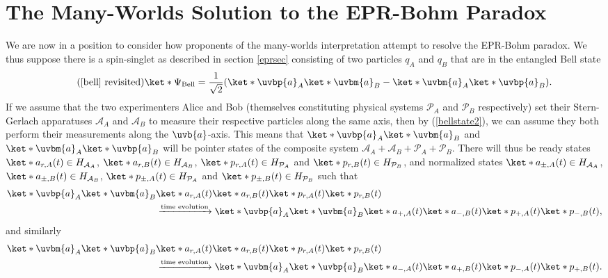 \documentclass[12pt]{report}
\begin{document}
   


\section{The Many-Worlds Solution to the EPR-Bohm Paradox}
We are now in a position to consider how proponents of the many-worlds interpretation attempt to resolve the EPR-Bohm paradox. We thus suppose there is a spin-singlet as described in section \ref{eprsec} consisting of two particles $q_A$ and $q_B$ that are in the entangled Bell state 
\begin{equation}\tag{\ref{bell} revisited}
      \ket*{\Psi_{\text{Bell}}}=\frac{1}{\sqrt{2}}(\ket*{\uvbp{a}}_A\ket*{\uvbm{a}}_B-\ket*{\uvbm{a}}_A\ket*{\uvbp{a}}_B).
\end{equation}
If we assume that the two experimenters Alice and Bob (themselves constituting physical systems $\mathcal{P}_A$ and $\mathcal{P}_B$ respectively) set their Stern-Gerlach apparatuses $\mathcal{A}_A$ and $\mathcal{A}_B$  %
%
to measure their respective particles along the same axis, then by (\ref{bellstate2}), we can assume they both perform their measurements along the $\uvb{a}$-axis. This means that $\ket*{\uvbp{a}}_A\ket*{\uvbm{a}}_B$ and $\ket*{\uvbm{a}}_A\ket*{\uvbp{a}}_B$ will be pointer states of the composite system $\mathcal{A}_A+\mathcal{A}_B+\mathcal{P}_A+\mathcal{P}_B$. There will thus be ready states $\ket*{a_{r,A}(t)}\in H_{\mathcal{A}_A}$, $\ket*{a_{r,B}(t)}\in H_{\mathcal{A}_B}$, $\ket*{p_{r,A}(t)}\in H_{\mathcal{P}_A}$ and $\ket*{p_{r,B}(t)}\in H_{\mathcal{P}_B}$, and normalized states  $\ket*{a_{\pm,A}(t)}\in H_{\mathcal{A}_A}$, $\ket*{a_{\pm,B}(t)}\in H_{\mathcal{A}_B}$, $\ket*{p_{\pm,A}(t)}\in H_{\mathcal{P}_A}$ and $\ket*{p_{\pm,B}(t)}\in H_{\mathcal{P}_B}$ such that  
\begin{align*}\ket*{\uvbp{a}}_A\ket*{\uvbm{a}}_B&\ket*{a_{r,A}(t)}\ket*{a_{r,B}(t)}\ket*{p_{r, A}(t)}\ket*{p_{r, B}(t)}\\ &\xrightarrow{\text{time evolution}}\ket*{\uvbp{a}}_A\ket*{\uvbm{a}}_B\ket*{a_{+,A}(t)}\ket*{a_{-,B}(t)}\ket*{p_{+, A}(t)}\ket*{p_{-, B}(t)},\end{align*}
and similarly
\begin{align*}\ket*{\uvbm{a}}_A\ket*{\uvbp{a}}_B&\ket*{a_{r,A}(t)}\ket*{a_{r,B}(t)}\ket*{p_{r, A}(t)}\ket*{p_{r, B}(t)}\\ &\xrightarrow{\text{time evolution}}\ket*{\uvbm{a}}_A\ket*{\uvbp{a}}_B\ket*{a_{-,A}(t)}\ket*{a_{+,B}(t)}\ket*{p_{-, A}(t)}\ket*{p_{+, B}(t)}.\end{align*}
\end{document}
